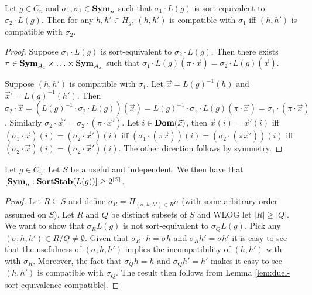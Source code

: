 \documentclass[../paper.tex]{subfiles}
\begin{document}
\begin{lem}
  \label{lem:duel-sort-equivalence-compatible}
  Let $g \in C_n$ and $\sigma_1, \sigma_1 \in \text{\textbf{Sym}}_n$ such that $\sigma_1 \cdot
  L(g)$ is sort-equivalent to $\sigma_2 \cdot L(g)$. Then for any $h,h' \in
  H_g$, $(h,h')$ is compatible with $\sigma_1$ iff $(h,h')$ is compatible with
  $\sigma_2$.
\end{lem}
\begin{proof}
  Suppose $\sigma_1 \cdot L(g)$ is sort-equivalent to $\sigma_2 \cdot L(g)$.
  Then there exists $\pi \in \text{\textbf{Sym}}_{A_1} \times \ldots \times \text{\textbf{Sym}}_{A_s}$ such
  that $\sigma_1 \cdot L(g) (\pi \cdot \vec{x}) = \sigma_2 \cdot L(g)
  (\vec{x})$.

  Suppose $(h, h')$ is compatible with $\sigma_1$. Let $\vec{x} = L(g)^{-1}(h)$
  and $\vec{x}' = L(g)^{-1}(h')$. Then $\sigma_2 \cdot \vec{x} = (L(g)^{-1}
  \cdot \sigma_2 \cdot L(g)) (\vec{x}) = L(g)^{-1} \cdot \sigma_1 \cdot L(g)(\pi
  \cdot \vec{x}) = \sigma_1 \cdot (\pi \cdot \vec{x})$. Similarly $\sigma_2
  \cdot \vec{x}' = \sigma_2 \cdot (\pi \cdot \vec{x}')$. Let $i \in \text{\textbf{Dom}}
  (\vec{x})$, then $\vec{x}(i) = \vec{x}'(i)$ iff $(\sigma_1 \cdot \vec{x})(i) =
  (\sigma_2 \cdot \vec{x}')(i)$ iff $(\sigma_1 \cdot (\pi \vec{x}))(i) =
  (\sigma_2 \cdot (\pi \vec{x}'))(i)$ iff $(\sigma_2 \cdot \vec{x})(i) =
  (\sigma_2 \cdot \vec{x}')(i)$. The other direction follows by symmetry.
\end{proof}


\begin{lem}
  \label{lem:useful-independant-set}
  Let $g \in C_n$. Let $S$ be a useful and independent. We then have that $[
  \text{\textbf{Sym}}_n: \text{\textbf{SortStab}}(L(g)) ] \geq 2^{\vert S \vert}$.
\end{lem}

\begin{proof}
  Let $R \subseteq S$ and define $\sigma_R = \Pi_{(\sigma, h, h') \in R} \sigma$
  (with some arbitrary order assumed on $S$). Let $R$ and $Q$ be distinct
  subsets of $S$ and WLOG let $\vert R \vert \geq \vert Q \vert$. We want to
  show that $\sigma_R L(g)$ is not sort-equivalent to $ \sigma_Q L(g)$. Pick any
  $(\sigma, h, h') \in R/Q \neq \emptyset$. Given that $\sigma_R \cdot h =
  \sigma h$ and $\sigma_R h' = \sigma h'$ it is easy to see that the usefulness
  of $(\sigma, h,h')$ implies the incompatibility of $(h,h')$ with with
  $\sigma_R$. Moreover, the fact that $\sigma_Q h = h$ and $\sigma_Q h' = h'$
  makes it easy to see $(h,h')$ is compatible with $\sigma_Q$. The result then
  follows from Lemma \ref{lem:duel-sort-equivalence-compatible}.
\end{proof}
\end{document}
